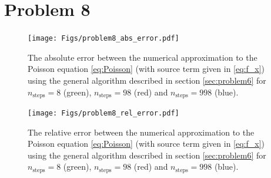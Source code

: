 \documentclass[english,notitlepage,reprint,nofootinbib]{revtex4-2}  %
\begin{document}
\section{Problem 8}
\begin{figure}[h!]
    \texttt{[image: Figs/problem8\_abs\_error.pdf]}
    \caption{The absolute error between the numerical approximation to the Poisson equation \eqref{eq:Poisson} (with source term given in \eqref{eq:f_x}) using the general algorithm described in section \ref{sec:problem6} for \(n_{\text{steps}}=8\) (green), \(n_{\text{steps}}=98\) (red) and \(n_{\text{steps}}=998\) (blue). }
    \label{fig:v_x}
\end{figure}
\begin{figure}[h!]
    \texttt{[image: Figs/problem8\_rel\_error.pdf]}
    \caption{The relative error between the numerical approximation to the Poisson equation \eqref{eq:Poisson} (with source term given in \eqref{eq:f_x}) using the general algorithm described in section \ref{sec:problem6} for \(n_{\text{steps}}=8\) (green), \(n_{\text{steps}}=98\) (red) and \(n_{\text{steps}}=998\) (blue). }
    \label{fig:v_x}
\end{figure}

\onecolumngrid
% 


\end{document}
